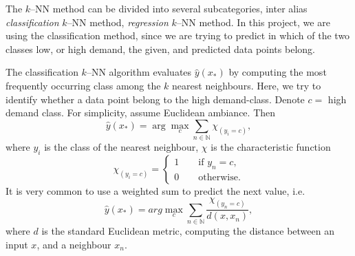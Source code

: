     The $k$--NN method can be divided into several subcategories, inter alias \emph{classification} $k$--NN method, \emph{regression}  $k$--NN method. In this project, we are using the classification method, since we are trying to predict in which of the two classes low, or high demand, the given, and predicted data points belong.

    The classification  $k$--NN algorithm evaluates $\hat{y}(x_{*})$ by computing the most frequently occurring class among the $k$ nearest neighbours. Here, we try to identify whether a data point belong to the high demand-class. Denote $c=$ high demand class. For simplicity, assume Euclidean ambiance. Then
        \begin{equation*}
            \hat{y}(x_*) = \arg \max_{c}  \sum_{n \in \mathbb{N}} \chi_{(y_i = c)} ,
        \end{equation*}
    where $y_i$ is the class of the nearest neighbour,  $\chi$ is the characteristic function 
        \begin{equation*}
            \chi_{(y_i = c)} = 
            \begin{cases}
                1 \qquad \text{if } y_n = c, \\
                0 \qquad \text{otherwise}.
                
            \end{cases}
        \end{equation*}
    It is very common to use a weighted sum to predict the next value, i.e.
        \begin{equation*}
            \hat{y}(x_*) =  arg \max_{c}  \sum_{n \in \mathbb{N}} \frac{\chi_{(y_n = c)}}{d(x, x_n)},
        \end{equation*}
    where $d$ is the standard Euclidean metric, computing the distance between an input $x$, and a neighbour $x_n$. 


